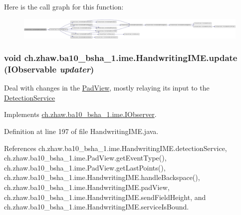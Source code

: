 Here is the call graph for this function:\nopagebreak
\begin{figure}[H]
\begin{center}
\leavevmode
\includegraphics[width=420pt]{classch_1_1zhaw_1_1ba10__bsha__1_1_1ime_1_1HandwritingIME_a25b3410857b8a7b81ad09b2a76ca352c_cgraph}
\end{center}
\end{figure}
\hypertarget{classch_1_1zhaw_1_1ba10__bsha__1_1_1ime_1_1HandwritingIME_a788cf4563e1480f6c3ea3ca6f07b2623}{
\subsubsection[{update}]{\setlength{\rightskip}{0pt plus 5cm}void ch.zhaw.ba10\_\-bsha\_\-1.ime.HandwritingIME.update ({\bf IObservable} {\em updater})}}
\label{classch_1_1zhaw_1_1ba10__bsha__1_1_1ime_1_1HandwritingIME_a788cf4563e1480f6c3ea3ca6f07b2623}
Deal with changes in the \hyperlink{classch_1_1zhaw_1_1ba10__bsha__1_1_1ime_1_1PadView}{PadView}, mostly relaying its input to the \hyperlink{}{DetectionService} 

Implements \hyperlink{interfacech_1_1zhaw_1_1ba10__bsha__1_1_1ime_1_1IObserver_a9bd8c4a6a6aaaf70d771c8f4b08a748d}{ch.zhaw.ba10\_\-bsha\_\-1.ime.IObserver}.

Definition at line 197 of file HandwritingIME.java.

References ch.zhaw.ba10\_\-bsha\_\-1.ime.HandwritingIME.detectionService, ch.zhaw.ba10\_\-bsha\_\-1.ime.PadView.getEventType(), ch.zhaw.ba10\_\-bsha\_\-1.ime.PadView.getLastPoints(), ch.zhaw.ba10\_\-bsha\_\-1.ime.HandwritingIME.handleBackspace(), ch.zhaw.ba10\_\-bsha\_\-1.ime.HandwritingIME.padView, ch.zhaw.ba10\_\-bsha\_\-1.ime.HandwritingIME.sendFieldHeight, and ch.zhaw.ba10\_\-bsha\_\-1.ime.HandwritingIME.serviceIsBound.

